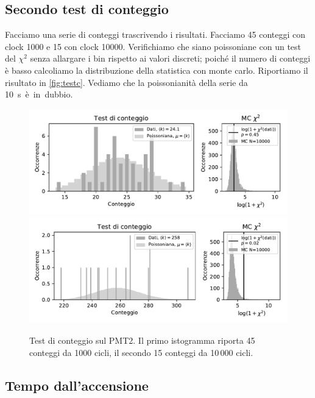 \documentclass[a4paper]{article}
\begin{document}
\subsection*{Secondo test di conteggio}

Facciamo una serie di conteggi trascrivendo i risultati.
Facciamo 45 conteggi con clock 1000 e 15 con clock \num{10000}.
Verifichiamo che siano poissoniane con un test del $\chi^2$ senza allargare i bin rispetto ai valori discreti;
poiché il numero di conteggi è basso calcoliamo la distribuzione della statistica con monte carlo.
Riportiamo il risultato in \autoref{fig:testc}.
Vediamo che la poissonianità della serie da \SI{10}s è in dubbio.

\begin{figure}
	\centering
	\includegraphics[width=\textwidth]{fig6a} \\
	\includegraphics[width=\textwidth]{fig6b}
	\caption{\label{fig:testc}
	Test di conteggio sul PMT2.
	Il primo istogramma riporta 45 conteggi da 1000 cicli,
	il secondo 15 conteggi da 10\,000 cicli.}
\end{figure}

\subsection*{Tempo dall'accensione}
\end{document}
